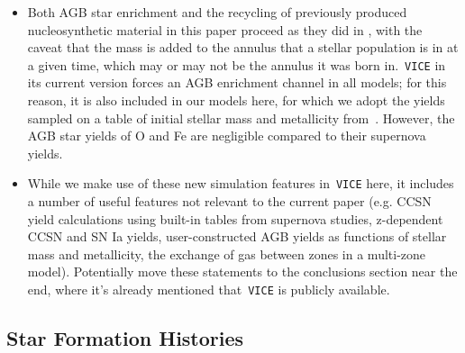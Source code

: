 \documentclass[fleqn, usenatbib]{mnras}
\begin{document}
\begin{itemize} 
	\item Both AGB star enrichment and the recycling of previously produced 
	nucleosynthetic material in this paper proceed as they did in 
	\citet{Johnson2020}, with the caveat that the mass is added to the annulus 
	that a stellar population is in at a given time, which may or may not be 
	the annulus it was born in.~\texttt{VICE} in its current version forces an 
	AGB enrichment channel in all models; for this reason, it is also included 
	in our models here, for which we adopt the yields sampled on a table of 
	initial stellar mass and metallicity from~\citet{Cristallo2011}. However, 
	the AGB star yields of O and Fe are negligible compared to their supernova
	yields. 

	\item While we make use of these new simulation features in~\texttt{VICE} 
	here, it includes a number of useful features not relevant to the current 
	paper (e.g. CCSN yield calculations using built-in tables from supernova 
	studies, z-dependent CCSN and SN Ia yields, user-constructed AGB yields as 
	functions of stellar mass and metallicity, the exchange of gas between 
	zones in a multi-zone model). {\color{red} Potentially move these 
	statements to the conclusions section near the end, where it's already 
	mentioned that~\texttt{VICE} is publicly available. } 
\end{itemize} 

\subsection{Star Formation Histories} 
\label{sec:methods:sfhs} 
\end{document}
